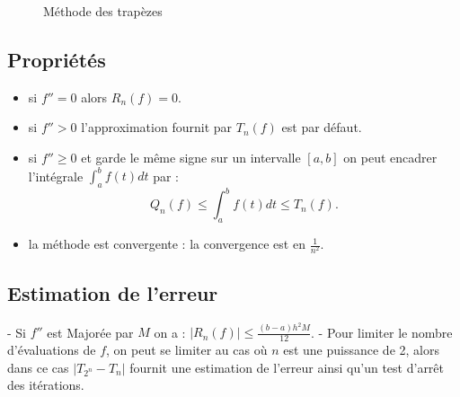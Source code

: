\begin{figure}[H]
	\caption{Méthode des trapèzes}
\end{figure}

\subsection{Propriétés}
\begin{itemize}
	\item si \( f'' = 0 \) alors \( R_n(f) = 0 \).
	\item si \( f'' > 0 \) l'approximation fournit par \( T_n(f) \) est par défaut.
	\item si \( f'' \geq 0 \) et garde le même signe sur un intervalle \([a, b]\) on peut encadrer l'intégrale \( \displaystyle\int_a^b f(t)dt \) par :
	\[
	Q_n(f) \leq \displaystyle\int_a^b f(t)dt \leq T_n(f).
	\]
	\item la méthode est convergente : la convergence est en \( \frac{1}{n^2} \).
\end{itemize}

\subsection{Estimation de l'erreur}
- Si \( f'' \) est Majorée par \( M \) on a : \( |R_n(f)| \leq \frac{(b-a)h^2M}{12} \).
- Pour limiter le nombre d'évaluations de \( f \), on peut se limiter au cas où \( n \) est une puissance de 2, alors dans ce cas \( |T_{2^n} - T_n| \) fournit une estimation de l'erreur ainsi qu'un test d'arrêt des itérations.


